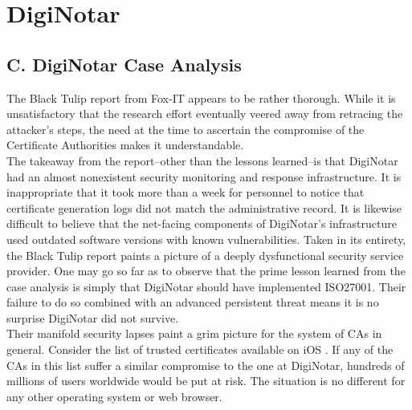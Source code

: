 \documentclass[a4paper]{llncs}
\begin{document}
\section{DigiNotar}
\subsection{C. DigiNotar Case Analysis}
The Black Tulip report from Fox-IT appears to be rather thorough. While it is unsatisfactory that the research effort eventually veered away from retracing the attacker’s steps, the need at the time to ascertain the compromise of the Certificate Authorities makes it understandable.\\

The takeaway from the report--other than the lessons learned--is that DigiNotar had an almost nonexistent security monitoring and response infrastructure. It is inappropriate that it took more than a week for personnel to notice that certificate generation logs did not match the administrative record. It is likewise difficult to believe that the net-facing components of DigiNotar’s infrastructure used outdated software versions with known vulnerabilities. Taken in its entirety, the Black Tulip report paints a picture of a deeply dysfunctional security service provider. One may go so far as to observe that the prime lesson learned from the case analysis is simply that DigiNotar should have implemented ISO27001. Their failure to do so combined with an advanced persistent threat means it is no surprise DigiNotar did not survive.\\

Their manifold security lapses paint a grim picture for the system of CAs in general. Consider the list of trusted certificates available on iOS \cite{apple2014list}. If any of the CAs in this list suffer a similar compromise to the one at DigiNotar, hundreds of millions of users worldwide would be put at risk. The situation is no different for any other operating system or web browser.\\
\end{document}
